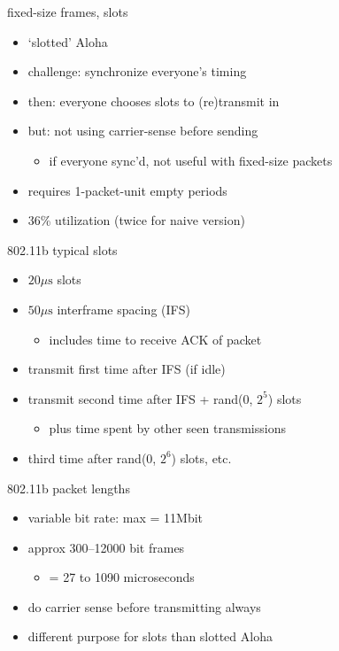 \begin{frame}{fixed-size frames, slots}
    \begin{itemize}
    \item `slotted' Aloha
    \item challenge: synchronize everyone's timing
    \item then: everyone chooses slots to (re)transmit in
    \item but: not using carrier-sense before sending
        \begin{itemize}
        \item if everyone sync'd, not useful with fixed-size packets
        \end{itemize}
    \vspace{.5cm}
    \item requires 1-packet-unit empty periods
    \item 36\% utilization (twice for naive version)
    \end{itemize}
\end{frame}

\begin{frame}{802.11b typical slots}
    \begin{itemize}
    \item $20 \mu\text{s}$ slots
    \item $50 \mu\text{s}$ interframe spacing (IFS)
        \begin{itemize}
        \item includes time to receive ACK of packet
        \end{itemize}
    \vspace{.5cm}
    \item transmit first time after IFS (if idle)
    \item transmit second time after IFS + rand($0$, $2^5$) slots
        \begin{itemize}
        \item plus time spent by other seen transmissions
        \end{itemize}
    \item third time after rand($0$, $2^6$) slots, etc.
    \end{itemize}
\end{frame}

\begin{frame}{802.11b packet lengths}
    \begin{itemize}
    \item variable bit rate: max = 11Mbit
    \item approx 300--12000 bit frames
        \begin{itemize}
        \item = 27 to 1090 microseconds
        \end{itemize}
    \vspace{.5cm}
    \item do carrier sense before transmitting always
    \item different purpose for slots than slotted Aloha
    \end{itemize}
\end{frame}
